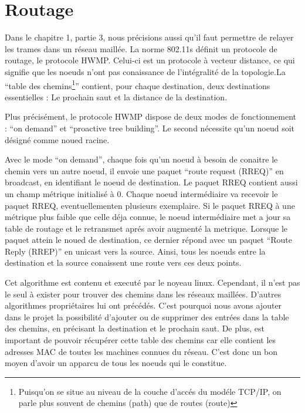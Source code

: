\section{Routage}

Dans le chapitre 1, partie 3, nous précisions aussi qu'il faut permettre de relayer les trames dans un réseau maillée. La norme
802.11s définit un protocole de routage, le protocole HWMP. Celui-ci est un protocole à vecteur distance, ce qui signifie que les
noeuds n'ont pas conaissance de l'intégralité de la topologie.La ``table des chemins\footnote{Puisqu'on se situe au niveau de la 
couche d'accés du modéle TCP/IP, on parle plus souvent de chemins (path) que de routes (route)}'' contient, pour chaque destination,
deux destinations essentielles : Le prochain saut et la distance de la destination.

Plus précisément, le protocole HWMP dispose de deux modes de fonctionnement : ``on demand'' et ``proactive tree building''. Le
second nécessite qu'un noeud soit désigné comme noued racine\cite{MNroute}.

Avec le mode ``on demand'', chaque fois qu'un noeud à besoin de conaitre le chemin vers un autre noeud, il envoie une paquet
``route request (RREQ)'' en broadcast, en identifiant le noeud de destination. Le paquet RREQ contient aussi un champ métrique
initialisé à 0. Chaque noeud intermédiaire va recevoir le paquet RREQ, eventuellementen plusieurs exemplaire. Si le paquet RREQ
à une métrique plus faible que celle déja connue, le noeud intermédiaire met a jour sa table de routage et le retransmet aprés avoir 
augmenté la metrique. Lorsque le paquet attein le noued de destination, ce dernier répond avec un paquet ``Route Reply (RREP)''
en unicast vers la source. Ainsi, tous les noeuds entre la destination et la source conaissent une route vers ces deux points.

Cet algorithme est contenu et executé par le noyeau linux. Cependant, il n'est pas le seul à exister pour trouver des chemins dans 
les réseaux maillées. D'autres algorithmes propriétaires lui ont précédés. C'est pourquoi nous avons ajouter dans le projet la
possibilité d'ajouter ou de supprimer des entrées dans la table des chemins, en précisant la destination et le prochain saut. De plus,
est important de pouvoir récupérer cette table des chemins car elle contient les adresses MAC de toutes les machines connues du 
réseau. C'est donc un bon moyen d'avoir un apparcu de tous les noeuds qui le constitue.